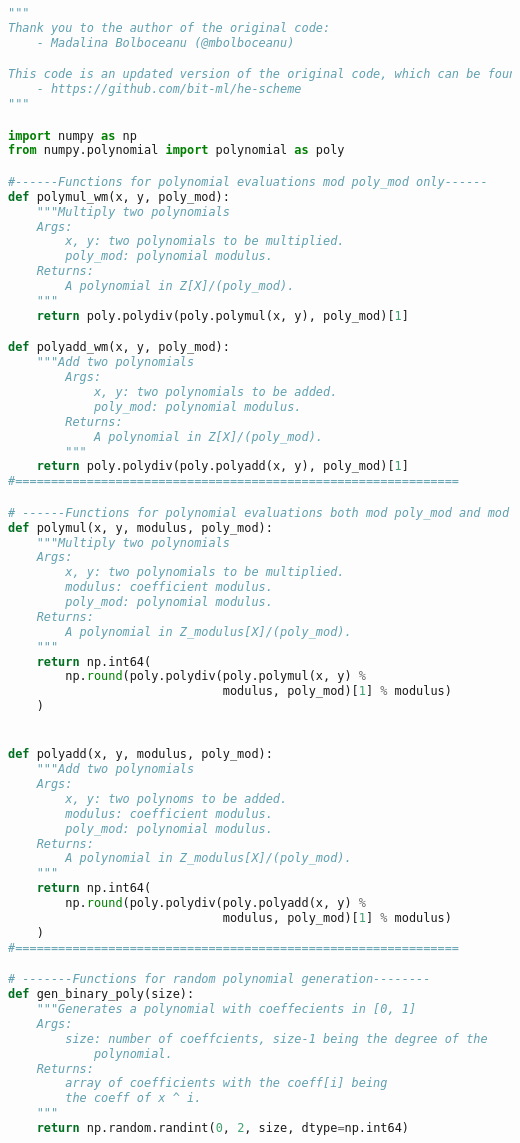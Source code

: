 \documentclass{article}
\begin{document}
\pagebreak

\begin{lstlisting}[language=Python]
"""
Thank you to the author of the original code:
    - Madalina Bolboceanu (@mbolboceanu)

This code is an updated version of the original code, which can be found here:
    - https://github.com/bit-ml/he-scheme
"""

import numpy as np
from numpy.polynomial import polynomial as poly

#------Functions for polynomial evaluations mod poly_mod only------
def polymul_wm(x, y, poly_mod):
    """Multiply two polynomials
    Args:
        x, y: two polynomials to be multiplied.
        poly_mod: polynomial modulus.
    Returns:
        A polynomial in Z[X]/(poly_mod).
    """
    return poly.polydiv(poly.polymul(x, y), poly_mod)[1]

def polyadd_wm(x, y, poly_mod):
    """Add two polynomials
        Args:
            x, y: two polynomials to be added.
            poly_mod: polynomial modulus.
        Returns:
            A polynomial in Z[X]/(poly_mod).
        """
    return poly.polydiv(poly.polyadd(x, y), poly_mod)[1]
#==============================================================

# ------Functions for polynomial evaluations both mod poly_mod and mod q-----
def polymul(x, y, modulus, poly_mod):
    """Multiply two polynomials
    Args:
        x, y: two polynomials to be multiplied.
        modulus: coefficient modulus.
        poly_mod: polynomial modulus.
    Returns:
        A polynomial in Z_modulus[X]/(poly_mod).
    """
    return np.int64(
        np.round(poly.polydiv(poly.polymul(x, y) %
                              modulus, poly_mod)[1] % modulus)
    )


def polyadd(x, y, modulus, poly_mod):
    """Add two polynomials
    Args:
        x, y: two polynoms to be added.
        modulus: coefficient modulus.
        poly_mod: polynomial modulus.
    Returns:
        A polynomial in Z_modulus[X]/(poly_mod).
    """
    return np.int64(
        np.round(poly.polydiv(poly.polyadd(x, y) %
                              modulus, poly_mod)[1] % modulus)
    )
#==============================================================

# -------Functions for random polynomial generation--------
def gen_binary_poly(size):
    """Generates a polynomial with coeffecients in [0, 1]
    Args:
        size: number of coeffcients, size-1 being the degree of the
            polynomial.
    Returns:
        array of coefficients with the coeff[i] being
        the coeff of x ^ i.
    """
    return np.random.randint(0, 2, size, dtype=np.int64)



\end{lstlisting}
\end{document}
